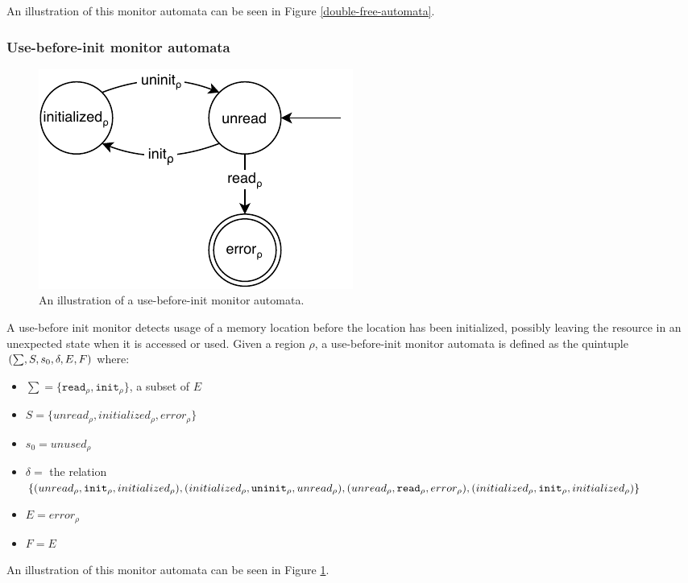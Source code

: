 An illustration of this monitor automata can be seen in Figure \ref{double-free-automata}. 

\subsubsection*{Use-before-init monitor automata}

\begin{figure}[H]
    \centering
    \includegraphics[width=0.5\textwidth]{algorithm/figures/use-before}
    \caption{An illustration of a use-before-init monitor automata.}
    \label{use-before-automata}
\end{figure}

A use-before init monitor detects usage of a memory location before the location has been initialized, possibly leaving the resource in an unexpected state when it is accessed or used. Given a region $\rho$, a use-before-init monitor automata is defined as the quintuple $(\sum, S, s_0, \delta, E, \\F)$ where: 

\begin{itemize}
    \item $\sum = \{\texttt{read}_\rho, \texttt{init}_\rho\}$, a subset of $E$
    \item $S = \{ unread_\rho, initialized_\rho, error_\rho \}$
    \item $s_0 = unused_\rho$ 
    \item $\delta =$ the relation $\{(unread_\rho, \texttt{init}_\rho, initialized_\rho), (initialized_\rho, \texttt{uninit}_\rho, unread_\rho), \\
    (unread_\rho, \texttt{read}_\rho, error_\rho), (initialized_\rho, \texttt{init}_\rho, initialized_\rho)\}$ 
    \item $E = error_\rho$  
    \item $F = E$
\end{itemize}

An illustration of this monitor automata can be seen in Figure \ref{use-before-automata}. 

